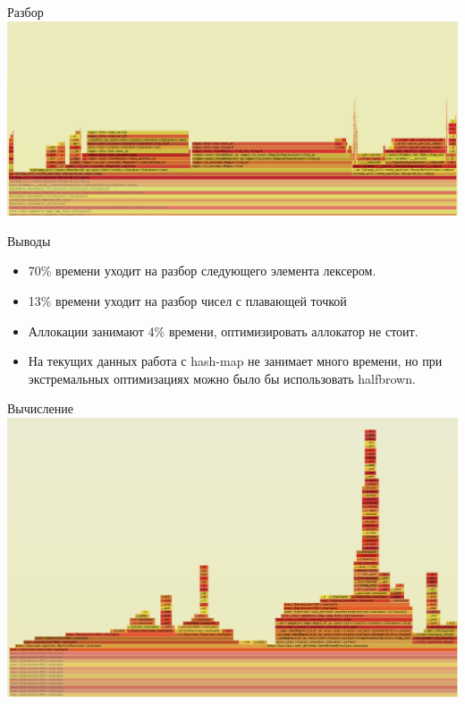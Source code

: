 \begin{frame}{Разбор}
    \includegraphics[width=\textwidth, height=0.8\textheight]{./fg_parse.png}
\end{frame}

\begin{frame}{Выводы}
  \begin{itemize}
    \item 70\% времени уходит на разбор следующего элемента лексером.
    \item 13\% времени уходит на разбор чисел с плавающей точкой
    \item Аллокации занимают 4\% времени, оптимизировать аллокатор не стоит.
    \item На текущих данных работа с hash-map не занимает много времени, но
          при экстремальных оптимизациях можно было бы использовать halfbrown.
  \end{itemize}
\end{frame}

\begin{frame}{Вычисление}
    \includegraphics[width=\textwidth, height=0.8\textheight]{./fg_evaluate.png}
\end{frame}


